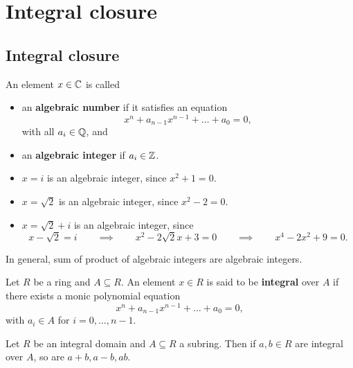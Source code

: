 \pagebreak

\section{Integral closure}

\subsection{Integral closure}

\begin{definition}
An element $ x \in \mathbb{C} $ is called
\begin{itemize}
\item an \textbf{algebraic number} if it satisfies an equation
$$ x^n + a_{n - 1}x^{n - 1} + \dots + a_0 = 0, $$
with all $ a_i \in \mathbb{Q} $, and
\item an \textbf{algebraic integer} if $ a_i \in \mathbb{Z} $.
\end{itemize}
\end{definition}

\begin{example*}
\hfill
\begin{itemize}
\item $ x = i $ is an algebraic integer, since $ x^2 + 1 = 0 $.
\item $ x = \sqrt{2} $ is an algebraic integer, since $ x^2 - 2 = 0 $.
\item $ x = \sqrt{2} + i $ is an algebraic integer, since
$$ x - \sqrt{2} = i \qquad \implies \qquad x^2 - 2\sqrt{2}x + 3 = 0 \qquad \implies \qquad x^4 - 2x^2 + 9 = 0. $$
\end{itemize}
\end{example*}

In general, sum of product of algebraic integers are algebraic integers.

\begin{definition}
Let $ R $ be a ring and $ A \subseteq R $. An element $ x \in R $ is said to be \textbf{integral} over $ A $ if there exists a monic polynomial equation
$$ x^n + a_{n - 1}x^{n - 1} + \dots + a_0 = 0, $$
with $ a_i \in A $ for $ i = 0, \dots, n - 1 $.
\end{definition}

\begin{theorem}
\label{thm:integralsubring}
Let $ R $ be an integral domain and $ A \subseteq R $ a subring. Then if $ a, b \in R $ are integral over $ A $, so are $ a + b, a - b, ab $.
\end{theorem}

